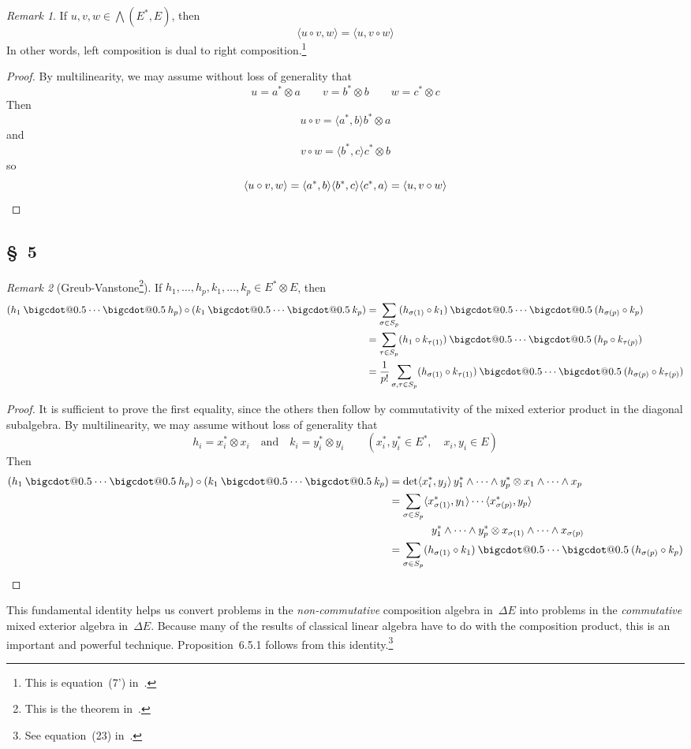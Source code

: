 \documentclass[letterpaper,12pt]{article}
\makeatletter
\newcommand{\bigcdot}[1]{\mathbin{\mathpalette\bigcdot@{#1}}}
\newcommand{\bigcdot@}[2]{%
  \sbox0{$#1\vcenter{}$}%
  \sbox2{$#1\cdot\m@th$}%
  \hbox{%
    \hfil
    \raise\ht0\hbox{%
      \scalebox{#2}{%
        \lower\ht0\hbox{$#1\bullet\m@th$}%
      }%
    }%
    \hfil
  }%
}
\newcommand{\after}{\circ}
\newcommand{\tprod}{\otimes}
\newcommand{\eprod}{\wedge}
\newcommand{\bigeprod}{\bigwedge}
\newcommand{\medeprod}{{\textstyle\bigeprod}}
\newcommand{\mprod}{\bigcdot{0.5}}
\newcommand{\sprod}[2]{\langle#1,#2\rangle}
\newcommand{\multi}[4]{#2_{#3}#1\cdots#1#2_{#4}}
\newcommand{\eprods}[3]{\multi{\eprod}{#1}{#2}{#3}}
\newcommand{\mprods}[3]{\multi{\mprod}{#1}{#2}{#3}}
\theoremstyle{definition}
\theoremstyle{remark}
\newtheorem*{rmk}{Remark}
\makeatother
\begin{document}
\begin{rmk}
If \(u,v,w\in\medeprod(E^*,E)\), then
\[\sprod{u\after v}{w}=\sprod{u}{v\after w}\]
In other words, left composition is dual to right composition.\footnote{This is equation~(7') in~\cite{greub4}.}
\end{rmk}
\begin{proof}
By multilinearity, we may assume without loss of generality that
\[u=a^*\tprod a\qquad v=b^*\tprod b\qquad w=c^*\tprod c\]
Then
\[u\after v=\sprod{a^*}{b}b^*\tprod a\]
and
\[v\after w=\sprod{b^*}{c}c^*\tprod b\]
so
\[\sprod{u\after v}{w}=\sprod{a^*}{b}\sprod{b^*}{c}\sprod{c^*}{a}=\sprod{u}{v\after w}\qedhere\]
\end{proof}

\subsection*{\S~5}
\begin{rmk}[Greub-Vanstone\footnote{This is the theorem in~\cite{greub4}.}]
If \(h_1,\ldots,h_p,k_1,\ldots,k_p\in E^*\tprod E\), then
\begin{align*}
(\mprods{h}{1}{p})\after(\mprods{k}{1}{p})&=\sum_{\sigma\in S_p}(h_{\sigma(1)}\after k_1)\mprod\cdots\mprod(h_{\sigma(p)}\after k_p)\\
	&=\sum_{\tau\in S_p}(h_1\after k_{\tau(1)})\mprod\cdots\mprod(h_p\after k_{\tau(p)})\\
	&=\frac{1}{p!}\sum_{\sigma,\tau\in S_p}(h_{\sigma(1)}\after k_{\tau(1)})\mprod\cdots\mprod(h_{\sigma(p)}\after k_{\tau(p)})
\end{align*}
\end{rmk}
\begin{proof}
It is sufficient to prove the first equality, since the others then follow by commutativity of the mixed exterior product in the diagonal subalgebra. By multilinearity, we may assume without loss of generality that
\[h_i=x^*_i\tprod x_i\quad\text{and}\quad k_i=y^*_i\tprod y_i\qquad (x^*_i,y^*_i\in E^*,\quad x_i,y_i\in E)\]
Then
\begin{align*}
(\mprods{h}{1}{p})\after(\mprods{k}{1}{p})&=\det\sprod{x^*_i}{y_j}\,\eprods{y^*}{1}{p}\tprod\eprods{x}{1}{p}\\
	&=\sum_{\sigma\in S_p}\sprod{x^*_{\sigma(1)}}{y_1}\cdots\sprod{x^*_{\sigma(p)}}{y_p}\\
		&\qquad\qquad\eprods{y^*}{1}{p}\tprod\eprods{x}{\sigma(1)}{\sigma(p)}\\
	&=\sum_{\sigma\in S_p}(h_{\sigma(1)}\after k_1)\mprod\cdots\mprod(h_{\sigma(p)}\after k_p)\qedhere
\end{align*}
\end{proof}
\noindent This fundamental identity helps us convert problems in the \emph{non-commutative} composition algebra in~\(\Delta E\) into problems in the \emph{commutative} mixed exterior algebra in~\(\Delta E\). Because many of the results of classical linear algebra have to do with the composition product, this is an important and powerful technique. Proposition~6.5.1 follows from this identity.\footnote{See equation~(23) in~\cite{greub4}.}
\end{document}
